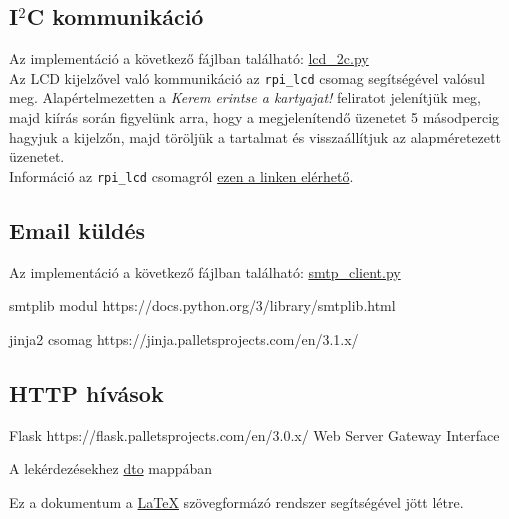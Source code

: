 \documentclass[11pt, a4paper]{article}
\begin{document}
		\subsection{I$^2$C kommunikáció}
			\begin{flushleft}
				\justifying
				Az implementáció a következő fájlban található:
				\color{blue} \href{https://github.com/mark182182/GKLB_INTM020_mikroelektromechanikai_rendszerek/blob/main/raspi/lcd_i2c.py}{lcd\_2c.py}
				\color{black} \\
				Az LCD kijelzővel való kommunikáció az \texttt{rpi\_lcd} csomag segítségével valósul meg. Alapértelmezetten a \emph{Kerem erintse a kartyajat!} feliratot jelenítjük meg, majd kiírás során figyelünk arra, hogy a megjelenítendő üzenetet 5 másodpercig hagyjuk a kijelzőn, majd töröljük a tartalmat és visszaállítjuk az alapméretezett üzenetet. \\
				Információ az \texttt{rpi\_lcd} csomagról
				\color{blue}
				\href{https://github.com/bogdal/rpi-lcd}{ezen a linken elérhető}\color{black}.
				
			\end{flushleft}
		
		\subsection{Email küldés}
		\begin{flushleft}
			\justifying
			Az implementáció a következő fájlban található:
			\color{blue} \href{https://github.com/mark182182/GKLB_INTM020_mikroelektromechanikai_rendszerek/blob/main/smtp/smtp_client.py}{smtp\_client.py}
			
			smtplib modul
			https://docs.python.org/3/library/smtplib.html
			
			jinja2 csomag
			https://jinja.palletsprojects.com/en/3.1.x/
		\end{flushleft}	
			
			
		\subsection{HTTP hívások}
			\label{subs:httpcalls}
			\begin{flushleft}
				\justifying
				Flask https://flask.palletsprojects.com/en/3.0.x/
				Web Server Gateway Interface
				
				A lekérdezésekhez 
				\color{blue}
				\href{https://github.com/mark182182/GKLB_INTM020_mikroelektromechanikai_rendszerek/tree/main/dto}{dto}
				\color{black} mappában
			\end{flushleft}
		\vfill
Ez a dokumentum a \color{blue} \href{https://www.latex-project.org/}{LaTeX} \color{black} szövegformázó rendszer segítségével jött létre.
\end{document}
